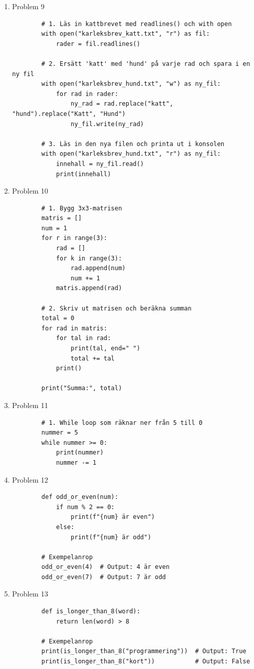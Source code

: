 \documentclass[11pt,a4paper]{article}
\begin{document}
\begin{enumerate}
\begin{lstlisting}
        # 3. Uppdatera ett värde
        lager["banan"] = 25
        print("Efter uppdatering av banan:", lager)

        # 4. Loopa över alla par med .items()
        print("\n--- LAGERSTATUS ---")
        for frukt, antal in lager.items():
            print(f"Frukt: {frukt:<8} | Antal i lager: {antal}")
    \end{lstlisting}
    \item Problem 9
    \begin{lstlisting}
        # 1. Läs in kattbrevet med readlines() och with open
        with open("karleksbrev_katt.txt", "r") as fil:
            rader = fil.readlines()

        # 2. Ersätt 'katt' med 'hund' på varje rad och spara i en ny fil
        with open("karleksbrev_hund.txt", "w") as ny_fil:
            for rad in rader:
                ny_rad = rad.replace("katt", "hund").replace("Katt", "Hund")
                ny_fil.write(ny_rad)

        # 3. Läs in den nya filen och printa ut i konsolen
        with open("karleksbrev_hund.txt", "r") as ny_fil:
            innehall = ny_fil.read()
            print(innehall)
    \end{lstlisting}
    \item Problem 10
    \begin{lstlisting}
        # 1. Bygg 3x3-matrisen
        matris = []
        num = 1
        for r in range(3):
            rad = []
            for k in range(3):
                rad.append(num)
                num += 1
            matris.append(rad)

        # 2. Skriv ut matrisen och beräkna summan
        total = 0
        for rad in matris:
            for tal in rad:
                print(tal, end=" ")
                total += tal
            print()

        print("Summa:", total)
    \end{lstlisting}
    \item Problem 11
    \begin{lstlisting}
        # 1. While loop som räknar ner från 5 till 0
        nummer = 5
        while nummer >= 0:
            print(nummer)
            nummer -= 1
    \end{lstlisting}
    \item Problem 12
    \begin{lstlisting}
        def odd_or_even(num):
            if num % 2 == 0:
                print(f"{num} är even")
            else:
                print(f"{num} är odd")

        # Exempelanrop
        odd_or_even(4)  # Output: 4 är even
        odd_or_even(7)  # Output: 7 är odd
    \end{lstlisting}
    \item Problem 13
    \begin{lstlisting}
        def is_longer_than_8(word):
            return len(word) > 8

        # Exempelanrop
        print(is_longer_than_8("programmering"))  # Output: True
        print(is_longer_than_8("kort"))           # Output: False
    \end{lstlisting}
\end{enumerate}
\end{document}
